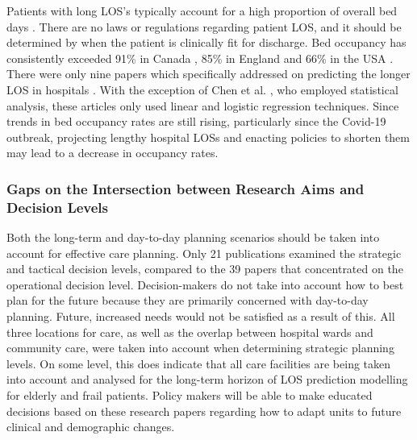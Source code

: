 \documentclass[../thesis.tex]{subfiles}
\begin{document}
Patients with long LOS's typically account for a high proportion of overall bed days \cite{Quinn2007}. There are no laws or regulations regarding patient LOS, and it should be determined by when the patient is clinically fit for discharge. Bed occupancy has consistently exceeded 91\% in Canada \cite{OECD2023}, 85\% in England \cite{BMA2023} and 66\% in the USA \cite{CDCP2017}. There were only nine papers which specifically addressed on predicting the longer LOS in hospitals \cite{Abe,Beauchet2013,Beauchet2018,Cacciatore2012,Chen2020,Kirfel2021,Lang2009,Launay2018,Motohashi2013}. With the exception of Chen et al. \cite{Chen2020}, who employed statistical analysis, these articles only used linear and logistic regression techniques. Since trends in bed occupancy rates are still rising, particularly since the Covid-19 outbreak, projecting lengthy hospital LOSs and enacting policies to shorten them may lead to a decrease in occupancy rates.




\subsubsection{Gaps on the Intersection between Research Aims and Decision Levels}

Both the long-term and day-to-day planning scenarios should be taken into account for effective care planning. Only 21 publications examined the strategic and tactical decision levels, compared to the 39 papers that concentrated on the operational decision level. Decision-makers do not take into account how to best plan for the future because they are primarily concerned with day-to-day planning. Future, increased needs would not be satisfied as a result of this. All three locations for care, as well as the overlap between hospital wards and community care, were taken into account when determining strategic planning levels. On some level, this does indicate that all care facilities are being taken into account and analysed for the long-term horizon of LOS prediction modelling for elderly and frail patients. Policy makers will be able to make educated decisions based on these research papers regarding how to adapt units to future clinical and demographic changes.
\end{document}
